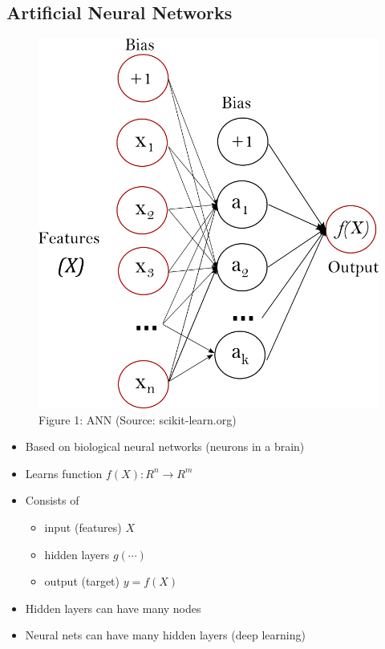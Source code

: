 \documentclass[
  letterpaper,
  DIV=11,
  numbers=noendperiod]{scrartcl}
\providecommand{\tightlist}{%
  \setlength{\itemsep}{0pt}\setlength{\parskip}{0pt}}\usepackage{longtable,booktabs,array}
\begin{document}
\hypertarget{artificial-neural-networks-1}{%
\subsection{Artificial Neural
Networks}\label{artificial-neural-networks-1}}

\begin{figure}

{\centering \includegraphics{multilayerperceptron_network.png}

}

\caption{Figure 1: ANN (Source: scikit-learn.org)}

\end{figure}

\begin{itemize}
\tightlist
\item
  Based on biological neural networks (neurons in a brain)
\item
  Learns function \(f(X): R^n \rightarrow R^m\)
\item
  Consists of

  \begin{itemize}
  \tightlist
  \item
    input (features) \(X\)
  \item
    hidden layers \(g(\cdots)\)
  \item
    output (target) \(y = f(X)\)
  \end{itemize}
\item
  Hidden layers can have many nodes
\item
  Neural nets can have many hidden layers (deep learning)
\end{itemize}
\end{document}
